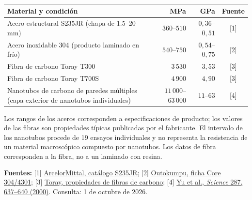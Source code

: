 \begin{table}[H]
\centering
\small
\renewcommand{\arraystretch}{1.25}
\begin{tabular}{@{}p{7.2cm}rrc@{}}
\toprule
\textbf{Material y condición} & \textbf{MPa} & \textbf{GPa} & \textbf{Fuente} \\
\midrule
Acero estructural S235JR (chapa de 1.5--20 mm) & $360$--$510$ & $0{,}36$--$0{,}51$ & [1] \\
Acero inoxidable 304 (producto laminado en frío) & $540$--$750$ & $0{,}54$--$0{,}75$ & [2] \\
Fibra de carbono Toray T300 & $3\,530$ & $3{,}53$ & [3] \\
Fibra de carbono Toray T700S & $4\,900$ & $4{,}90$ & [3] \\
Nanotubos de carbono de paredes múltiples (capa exterior de nanotubos individuales) & $11\,000$--$63\,000$ & $11$--$63$ & [4] \\
\bottomrule
\end{tabular}
\par\medskip
\begin{minipage}{\textwidth}
\footnotesize
Los rangos de los aceros corresponden a especificaciones de producto; los valores de las fibras son propiedades típicas publicadas por el fabricante. El intervalo de los nanotubos procede de 19 ensayos individuales y no representa la resistencia de un material macroscópico compuesto por nanotubos. Los datos de fibra corresponden a la fibra, no a un laminado con resina.

\textbf{Fuentes:} [1] \href{https://industry.arcelormittal.com/catalogue/A30/EN}{ArcelorMittal, catálogo S235JR}; [2] \href{https://www.outokumpu.com/en/products/product-ranges/-/media/files/products/core/outokumpu-core-range-datasheet.pdf}{Outokumpu, ficha Core 304/4301}; [3] \href{https://www.toraycma.com/products/carbon-fiber/}{Toray, propiedades de fibras de carbono}; [4] \href{https://doi.org/10.1126/science.287.5453.637}{Yu et al., \emph{Science} 287, 637--640 (2000)}. Consulta: 1 de octubre de 2026.
\end{minipage}
\end{table}

